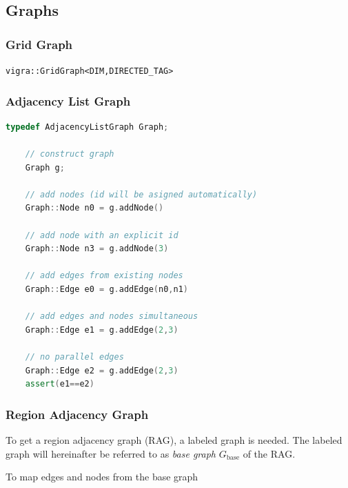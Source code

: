 \subsection{Graphs}


\subsubsection{Grid Graph} \label{sec:graphs_grid_graph}


    \lstinline{vigra::GridGraph<DIM,DIRECTED_TAG>}

\subsubsection{Adjacency List Graph} \label{sec:graphs_adjacency_list_graph}


    \begin{minipage}{\textwidth}\vspace{-0.75cm}\begin{lstlisting}[language=c++]
    typedef AdjacencyListGraph Graph;

    // construct graph
    Graph g;

    // add nodes (id will be asigned automatically)
    Graph::Node n0 = g.addNode() 

    // add node with an explicit id
    Graph::Node n3 = g.addNode(3)

    // add edges from existing nodes
    Graph::Edge e0 = g.addEdge(n0,n1)

    // add edges and nodes simultaneous 
    Graph::Edge e1 = g.addEdge(2,3)

    // no parallel edges 
    Graph::Edge e2 = g.addEdge(2,3)
    assert(e1==e2)  
    \end{lstlisting}\end{minipage}\vspace{0.5cm}



\subsubsection{Region Adjacency Graph} \label{sec:graphs_rag}

To get a region adjacency graph (RAG), a labeled graph is needed.
The labeled graph will hereinafter be referred to as \emph{base graph} 
$G_{\text{base}}$
of the RAG.

To map edges and nodes from the base graph


